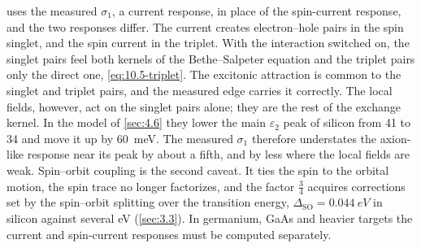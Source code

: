 uses the measured $\sigma_1$, a current response, in place of the spin-current response, and the two responses differ. The current creates electron--hole pairs in the spin singlet, and the spin current in the triplet. With the interaction switched on, the singlet pairs feel both kernels of the Bethe--Salpeter equation and the triplet pairs only the direct one, \cref{eq:10.5-triplet}. The excitonic attraction is common to the singlet and triplet pairs, and the measured edge carries it correctly. The local fields, however, act on the singlet pairs alone; they are the rest of the exchange kernel. In the model of \cref{sec:4.6} they lower the main $\varepsilon_2$ peak of silicon from 41 to 34 and move it up by \SI{60}{meV}. The measured $\sigma_1$ therefore understates the axion-like response near its peak by about a fifth, and by less where the local fields are weak. Spin--orbit coupling is the second caveat. It ties the spin to the orbital motion, the spin trace no longer factorizes, and the factor $\frac34$ acquires corrections set by the spin--orbit splitting over the transition energy, $\Delta_{\mathrm{SO}} = \SI{0.044}{eV}$ in silicon against several eV (\cref{sec:3.3}). In germanium, GaAs and heavier targets the current and spin-current responses must be computed separately.

